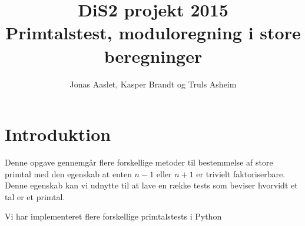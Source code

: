 \documentclass[a4paper]{article}
\title{DiS2 projekt 2015\\Primtalstest, moduloregning i store beregninger}
\author{Jonas Aaslet, Kasper Brandt og Truls Asheim}
\begin{document}
\begin{titlepage}
\maketitle
\end{titlepage}


\section{Introduktion}

Denne opgave gennemgår flere forskellige metoder til bestemmelse af
store primtal med den egenskab at enten $n-1$ eller $n+1$ er trivielt
faktoriserbare. Denne egenskab kan vi udnytte til at lave en række
tests som beviser hvorvidt et tal er et primtal. 

Vi har implementeret flere forskellige primtalstests i Python 







\end{document}

